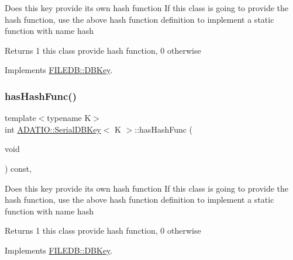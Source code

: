Does this key provide its own hash function If this class is going to provide the hash function, use the above hash function definition to implement a static function with name hash

\begin{DoxyReturn}{Returns}
1 this class provide hash function, 0 otherwise 
\end{DoxyReturn}


Implements \mbox{\hyperlink{classFILEDB_1_1DBKey_a541dab4f4083ae951dee2f30483eb18e}{F\+I\+L\+E\+D\+B\+::\+D\+B\+Key}}.

\mbox{\label{classADATIO_1_1SerialDBKey_ae8926cd9bdef006f3729f4b724a2e2fe}} 
\subsubsection{\texorpdfstring{hasHashFunc()}{hasHashFunc()}\hspace{0.1cm}{\footnotesize\ttfamily [3/3]}}
{\footnotesize\ttfamily template$<$typename K$>$ \\
int \mbox{\hyperlink{classADATIO_1_1SerialDBKey}{A\+D\+A\+T\+I\+O\+::\+Serial\+D\+B\+Key}}$<$ K $>$\+::has\+Hash\+Func (\begin{DoxyParamCaption}\item[{void}]{ }\end{DoxyParamCaption}) const\hspace{0.3cm}{\ttfamily [inline]}, {\ttfamily [virtual]}}

Does this key provide its own hash function If this class is going to provide the hash function, use the above hash function definition to implement a static function with name hash

\begin{DoxyReturn}{Returns}
1 this class provide hash function, 0 otherwise 
\end{DoxyReturn}


Implements \mbox{\hyperlink{classFILEDB_1_1DBKey_a541dab4f4083ae951dee2f30483eb18e}{F\+I\+L\+E\+D\+B\+::\+D\+B\+Key}}.

\mbox{\label{classADATIO_1_1SerialDBKey_a9dc566bd8bc83d98d4438d220012648a}} 
